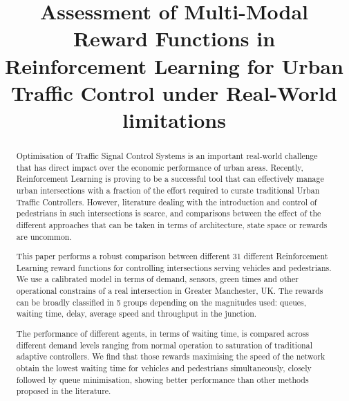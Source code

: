 \documentclass[conference]{IEEEtran}
\begin{document}
\title{Assessment of Multi-Modal Reward Functions in Reinforcement Learning for Urban Traffic Control under Real-World limitations}


\author{
\and
{}
}

\maketitle

\begin{abstract}
Optimisation of Traffic Signal Control Systems is an important real-world challenge that has direct impact over the economic performance of urban areas.
Recently, Reinforcement Learning is proving to be a successful tool that can effectively manage urban intersections with a fraction of the effort required to curate traditional Urban Traffic Controllers. However, literature dealing with the introduction and control of pedestrians in such intersections is scarce, and comparisons between the effect of the different approaches that can be taken in terms of architecture, state space or rewards are uncommon.

This paper performs a robust comparison between different 31 different Reinforcement Learning reward functions for controlling intersections serving vehicles and pedestrians. 
We use a calibrated model in terms of demand, sensors, green times and other operational constrains of a real intersection in Greater Manchester, UK.
The rewards can be broadly classified in 5 groups depending on the magnitudes used: queues, waiting time, delay, average speed and throughput in the junction.
 
The performance of different agents, in terms of waiting time, is compared across different demand levels ranging from normal operation to saturation of traditional adaptive controllers.
We find that those rewards maximising the speed of the network obtain the lowest waiting time for vehicles and pedestrians simultaneously, closely followed by queue minimisation, showing better performance than other methods proposed in the literature.
\end{abstract}
\end{document}
